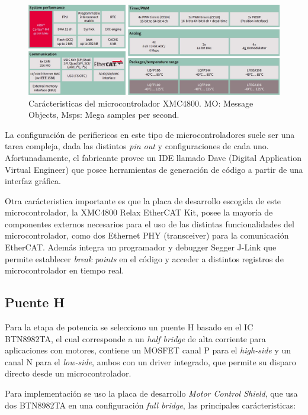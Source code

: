\begin{figure}[ht]
  \centering
  \includegraphics[scale=.2]{img/cap3/xmc4800_data}
  \caption{Carácteristicas del microcontrolador XMC4800. MO: Message Objects, Msps: Mega samples per second.}
  \label{cap3_xmc4800_data}
\end{figure}

La configuración de perifiericos en este tipo de microcontroladores suele ser una tarea compleja, dada las distintos \textit{pin out} y configuraciones de cada uno. Afortunadamente, el fabricante provee un IDE llamado Dave (Digital Application Virtual Engineer) que posee herramientas de generación de código a partir de una interfaz gráfica.

Otra carácteristica importante es que la placa de desarrollo escogida de este microcontrolador, la XMC4800 Relax EtherCAT Kit, posee la mayoría de componentes externos necesarios para el uso de las distintas funcionalidades del microcontrolador, como dos Ethernet PHY (transceiver) para la comunicación EtherCAT. Además integra un programador y debugger Segger J-Link que permite establecer \textit{break points} en el código y acceder a distintos registros de microcontrolador en tiempo real.
 

\subsection{Puente H}

Para la etapa de potencia se selecciono un puente H basado en el IC BTN8982TA, el cual corresponde a un \textit{half bridge} de alta corriente para aplicaciones con motores, contiene 
un MOSFET canal P para el \textit{high-side} y un canal N para el \textit{low-side}, ambos con un driver integrado, que permite su disparo directo desde un microcontrolador.

Para implementación se uso la placa de desarrollo \textit{Motor Control Shield}, que usa dos BTN8982TA en una configuración \textit{full bridge}, las principales carácteristicas:

